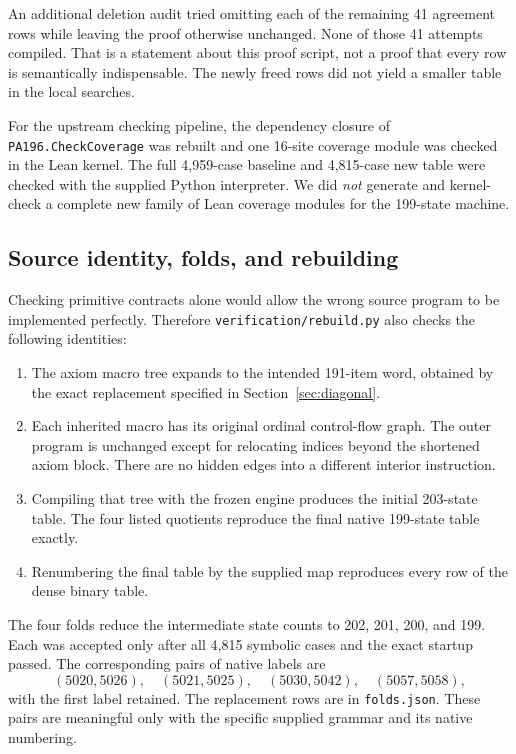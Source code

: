 An additional deletion audit tried omitting each of the remaining 41 agreement rows while leaving the proof otherwise unchanged. None of those 41 attempts compiled. That is a statement about this proof script, not a proof that every row is semantically indispensable. The newly freed rows did not yield a smaller table in the local searches.

For the upstream checking pipeline, the dependency closure of \texttt{PA196.CheckCoverage} was rebuilt and one 16-site coverage module was checked in the Lean kernel. The full 4,959-case baseline and 4,815-case new table were checked with the supplied Python interpreter. We did \emph{not} generate and kernel-check a complete new family of Lean coverage modules for the 199-state machine.

\subsection{Source identity, folds, and rebuilding}
Checking primitive contracts alone would allow the wrong source program to be implemented perfectly. Therefore \texttt{verification/rebuild.py} also checks the following identities:
\begin{enumerate}
\item The axiom macro tree expands to the intended 191-item word, obtained by the exact replacement specified in Section~\ref{sec:diagonal}.
\item Each inherited macro has its original ordinal control-flow graph. The outer program is unchanged except for relocating indices beyond the shortened axiom block. There are no hidden edges into a different interior instruction.
\item Compiling that tree with the frozen engine produces the initial 203-state table. The four listed quotients reproduce the final native 199-state table exactly.
\item Renumbering the final table by the supplied map reproduces every row of the dense binary table.
\end{enumerate}
The four folds reduce the intermediate state counts to 202, 201, 200, and 199. Each was accepted only after all 4,815 symbolic cases and the exact startup passed. The corresponding pairs of native labels are
\[
 (5020,5026),\quad(5021,5025),\quad(5030,5042),\quad(5057,5058),
\]
with the first label retained. The replacement rows are in \texttt{folds.json}. These pairs are meaningful only with the specific supplied grammar and its native numbering.

